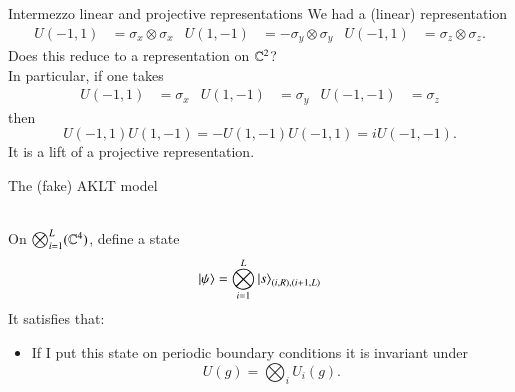 \documentclass{beamer}
\begin{document}
\begin{frame}{Intermezzo linear and projective representations}
	We had a (linear) representation
	\begin{align*}
			U(-1,1)&=\sigma_x\otimes \sigma_x&U(1,-1)&=-\sigma_y\otimes \sigma_y&U(-1,1)&=\sigma_z\otimes \sigma_z.
	\end{align*}
	\pause
	Does this reduce to a representation on $\mathbb{C}^2$?\\
	\pause
	In particular, if one takes
	\begin{align}
		U(-1,1)&=\sigma_x&U(1,-1)&=\sigma_y&U(-1,-1)&=\sigma_z
	\end{align}
	then
	\begin{equation}
		U(-1,1)U(1,-1)=-U(1,-1)U(-1,1)=i U(-1,-1).
	\end{equation}
	It is a lift of a projective representation.
\end{frame}

\begin{frame}{The (fake) AKLT model}
	\\
	On $\bigotimes_{i=1}^L(\mathbb{C}^4)$, define a state
	\begin{equation}
		\ket{\psi}=\bigotimes_{i=1}^L\ket{s}_{(i,R),(i+1,L)}
	\end{equation}
	\pause
	It satisfies that:
	\begin{itemize}
		\item If I put this state on periodic boundary conditions it is invariant under
		\begin{equation}
			U(g)=\bigotimes_i U_i(g).
		\end{equation}
	\end{itemize}
\end{frame}
\end{document}

